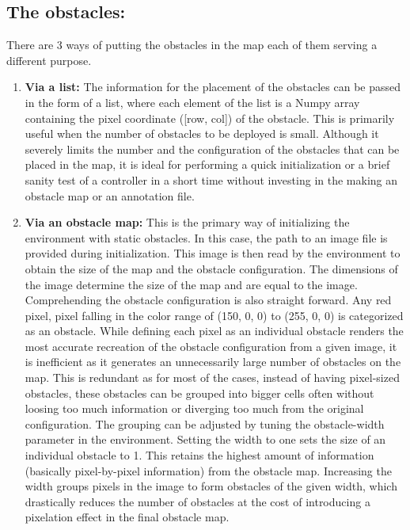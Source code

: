 \subsection{The obstacles:}
There are 3 ways of putting the obstacles in the map each of them serving a different purpose.
\begin{enumerate}
\item \textbf{Via a list:}
The information for the placement of the obstacles can be passed in the form of a list, where each element of the list is a Numpy array containing the pixel coordinate ([row, col]) of the obstacle. This is primarily useful when the number of obstacles to be deployed is small. Although it severely limits the number and the configuration of the obstacles that can be placed in the map, it is ideal for performing a quick initialization or a brief sanity test of a controller in a short time without investing in the making an obstacle map or an annotation file.
\item \textbf{Via an obstacle map:}
This is the primary way of initializing the environment with static obstacles. In this case, the path to an image file is provided during initialization. This image is then read by the environment to obtain the size of the map and the obstacle configuration. 
The dimensions of the image determine the size of the map and are equal to the image. Comprehending the obstacle configuration is also straight forward. Any red pixel, pixel falling in the color range of (150, 0, 0) to (255, 0, 0) is categorized as an obstacle. While defining each pixel as an individual obstacle renders the most accurate recreation of the obstacle configuration from a given image, it is inefficient as it generates an unnecessarily large number of obstacles on the map.
This is redundant as for most of the cases, instead of having pixel-sized obstacles,  these obstacles can be grouped into bigger cells often without loosing too much information or diverging too much from the original configuration. The grouping can be adjusted by tuning the obstacle-width parameter in the environment.  Setting the width to one sets the size of an individual obstacle to 1. This retains the highest amount of information (basically pixel-by-pixel information) from the obstacle map. Increasing the width groups pixels in the image to form obstacles of the given width, which drastically reduces the number of obstacles at the cost of introducing a pixelation effect in the final obstacle map.

\end{enumerate}
